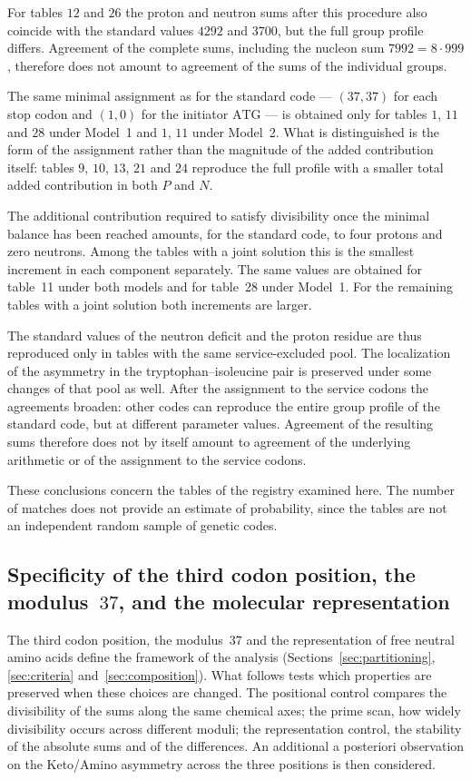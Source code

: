 \documentclass[11pt,a4paper]{article}
\renewcommand{\_}{\origunderscore\allowbreak}
\begin{document}
For tables $12$ and $26$ the proton and neutron sums after this
procedure also coincide with the standard values $4292$ and
$3700$, but
the full group profile differs. Agreement of the complete sums,
including the nucleon sum $7992=8\cdot999$, therefore does not
amount to
agreement of the sums of the individual groups.

The same minimal assignment as for the standard code --- $(37,37)$
for
each stop codon and $(1,0)$ for the initiator $\mathrm{ATG}$ ---
is obtained only
for tables $1$, $11$ and $28$ under Model~1 and $1$, $11$ under
Model~2. What is distinguished is the form of the assignment
rather than the magnitude of the added contribution itself: tables
$9$, $10$, $13$, $21$ and $24$ reproduce the full profile with a
smaller total added contribution in both $P$ and $N$.

The additional contribution required to satisfy divisibility once
the minimal balance has been reached amounts, for the standard
code, to four protons and zero neutrons. Among the tables with a
joint solution this is the smallest increment in each component
separately. The same values are obtained for table~11 under both
models and for table~28 under Model~1. For the remaining tables
with a joint solution both increments are larger.

The standard values of the neutron deficit and the proton residue
are thus reproduced only in tables with the same service-excluded
pool. The localization of the asymmetry in the
tryptophan--isoleucine pair is preserved under some changes of
that pool as well. After the assignment to the service codons the
agreements broaden: other codes can reproduce the entire group
profile of the standard code, but at different parameter values.
Agreement of the resulting sums therefore does not by itself
amount to agreement of the underlying arithmetic or of the
assignment to the service codons.

These conclusions concern the tables of the registry examined
here. The number of matches does not provide an estimate of
probability, since the tables are not an independent random sample
of genetic codes.

\subsection{Specificity of the third codon position, the modulus~\texorpdfstring{$37$}{37}, and the molecular representation}
\label{sec:discussion-controls}

The third codon position, the modulus~$37$ and the representation of
free neutral amino acids define the framework of the analysis
(Sections~\ref{sec:partitioning}, \ref{sec:criteria}
and~\ref{sec:composition}). What follows tests which properties are
preserved when these choices are changed. The positional control
compares the divisibility of the sums along the same chemical axes;
the prime scan, how widely divisibility occurs across different
moduli; the representation control, the stability of the absolute
sums and of the differences. An additional a posteriori observation
on the Keto/Amino asymmetry across the three positions is then
considered.
\end{document}
